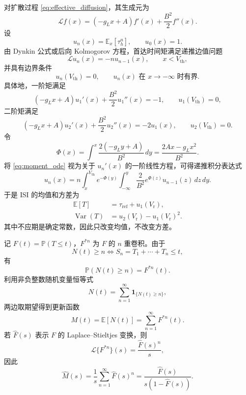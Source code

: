 \documentclass[UTF8]{ctexart}
\begin{document}
对扩散过程 \eqref{eq:effective_diffusion}，其生成元为
\[
\mathcal L f(x)=(-g_Lx+A)f'(x)+\frac{B^2}{2}f''(x).
\]
设
\[
u_n(x)=\mathbb E_x[\tau_h^n],\qquad u_0(x)=1.
\]
由 Dynkin 公式或后向 Kolmogorov 方程，首达时间矩满足递推边值问题
\begin{equation}
	\mathcal L u_n(x)=-n u_{n-1}(x),\qquad x<V_{\mathrm{th}},
	\label{eq:moment_ode}
\end{equation}
并具有边界条件
\[
u_n(V_{\mathrm{th}})=0,\qquad u_n(x)\text{ 在 }x\to-\infty\text{ 时有界}.
\]
具体地，一阶矩满足
\begin{equation}
	(-g_Lx+A)u_1'(x)+\frac{B^2}{2}u_1''(x)=-1,
	\qquad u_1(V_{\mathrm{th}})=0,
	\label{eq:first_moment_ode}
\end{equation}
二阶矩满足
\begin{equation}
	(-g_Lx+A)u_2'(x)+\frac{B^2}{2}u_2''(x)=-2u_1(x),
	\qquad u_2(V_{\mathrm{th}})=0.
	\label{eq:second_moment_ode}
\end{equation}
令
\[
\Phi(x)=\int^x \frac{2(-g_Ly+A)}{B^2}\,dy
=\frac{2Ax-g_Lx^2}{B^2}.
\]
将 \eqref{eq:moment_ode} 视为关于 $u_n'(x)$ 的一阶线性方程，可得递推积分表达式
\begin{equation}
	u_n(x)=
	n\int_x^{V_{\mathrm{th}}}
	e^{-\Phi(y)}
	\int_{-\infty}^{y}\frac{2}{B^2}e^{\Phi(z)}u_{n-1}(z)\,dz\,dy .
	\label{eq:moment_integral}
\end{equation}
于是 ISI 的均值和方差为
\begin{align}
	\mathbb E[T]
	&=\tau_{\mathrm{ref}}+u_1(V_{\mathrm r}), \label{eq:isi_mean}\\
	\operatorname{Var}(T)
	&=u_2(V_{\mathrm r})-u_1(V_{\mathrm r})^2. \label{eq:isi_var}
\end{align}
其中不应期是确定常数，因此只改变均值，不改变方差。


记 $F(t)=\mathbb P(T\le t)$，$F^{*n}$ 为 $F$ 的 $n$ 重卷积。由于
\[
N(t)\ge n \iff S_n=T_1+\cdots+T_n\le t,
\]
有
\[
\mathbb P(N(t)\ge n)=F^{*n}(t).
\]
利用非负整数随机变量恒等式
\[
N(t)=\sum_{n=1}^{\infty}\mathbf 1_{\{N(t)\ge n\}},
\]
两边取期望得到更新函数
\begin{equation}
	M(t)=\mathbb E[N(t)]
	=\sum_{n=1}^{\infty}F^{*n}(t).
	\label{eq:renewal_mean_exact}
\end{equation}
若 $\widehat F(s)$ 表示 $F$ 的 Laplace--Stieltjes 变换，则
\[
\mathcal L\{F^{*n}\}(s)=\frac{\widehat F(s)^n}{s},
\]
因此
\begin{equation}
	\widehat M(s)
	=\frac{1}{s}\sum_{n=1}^{\infty}\widehat F(s)^n
	=\frac{\widehat F(s)}{s(1-\widehat F(s))}.
	\label{eq:renewal_laplace}
\end{equation}
\end{document}
